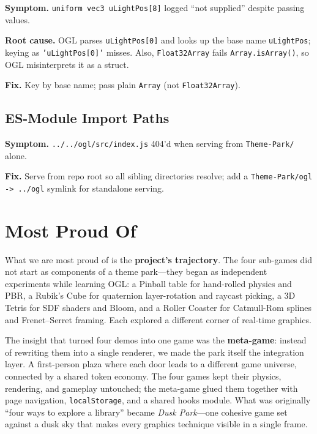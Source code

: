 \documentclass[10pt,a4paper]{article}
\begin{document}
\textbf{Symptom.} \texttt{uniform vec3 uLightPos[8]} logged ``not supplied'' despite
passing values.

\textbf{Root cause.} OGL parses \texttt{uLightPos[0]} and looks up the base name
\texttt{uLightPos}; keying as \texttt{'uLightPos[0]'} misses. Also,
\texttt{Float32Array} fails \texttt{Array.isArray()}, so OGL misinterprets it as a struct.

\textbf{Fix.} Key by base name; pass plain \texttt{Array} (not \texttt{Float32Array}).

\subsection{ES-Module Import Paths}

\textbf{Symptom.} \texttt{../../ogl/src/index.js} 404'd when serving from
\texttt{Theme-Park/} alone.

\textbf{Fix.} Serve from repo root so all sibling directories resolve; add a
\texttt{Theme-Park/ogl -> ../ogl} symlink for standalone serving.

\section{Most Proud Of}

What we are most proud of is the \textbf{project's trajectory}. The four sub-games did not
start as components of a theme park---they began as independent experiments while learning
OGL: a Pinball table for hand-rolled physics and PBR, a Rubik's Cube for quaternion
layer-rotation and raycast picking, a 3D Tetris for SDF shaders and Bloom, and a Roller
Coaster for Catmull-Rom splines and Frenet--Serret framing. Each explored a different
corner of real-time graphics.

The insight that turned four demos into one game was the \textbf{meta-game}: instead of
rewriting them into a single renderer, we made the park itself the integration layer. A
first-person plaza where each door leads to a different game universe, connected by a
shared token economy. The four games kept their physics, rendering, and gameplay untouched;
the meta-game glued them together with page navigation, \texttt{localStorage}, and a shared
hooks module. What was originally ``four ways to explore a library'' became \emph{Dusk
Park}---one cohesive game set against a dusk sky that makes every graphics technique
visible in a single frame.
\end{document}
